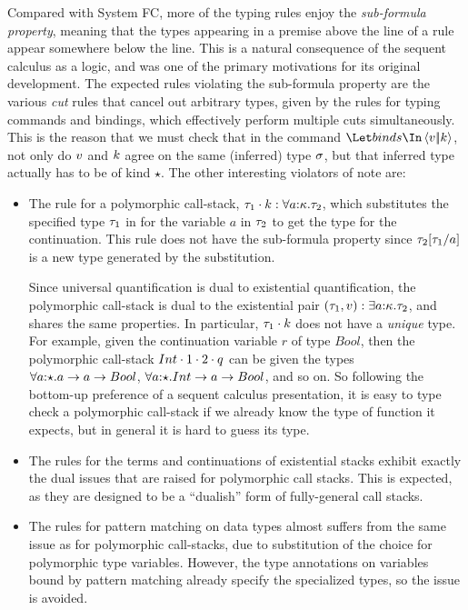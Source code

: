\documentclass{article}
\begin{document}
Compared with System FC, more of the typing rules enjoy the
\emph{sub-formula property}, meaning that the types appearing in a premise above
the line of a rule appear somewhere below the line.  This is a natural
consequence of the sequent calculus as a logic, and was one of the primary
motivations for its original development.  The expected rules violating the
sub-formula property are the various \emph{cut} rules that cancel out arbitrary
types, given by the rules for typing commands and bindings, which effectively
perform multiple cuts simultaneously.  This is the reason that we must check
that in the command $\mcut{\tm}{\ko}{\binds}$, not only do $v$ and $k$ agree
on the same (inferred) type $\sigma$, but that inferred type actually has to be of
kind $\star$.  The other interesting violators of note are:
\begin{itemize}
\item The rule for a polymorphic call-stack,
  ${\tau_1}\cdot{k} : \forall a{:}{\kappa}.\tau_2$, which substitutes the
  specified type $\tau_1$ in for the variable $a$ in $\tau_2$ to get the type for
  the continuation.  This rule does not have the sub-formula property since
  $\tau_2[\tau_1/a]$ is a new type generated by the substitution.

  Since universal quantification is dual to existential quantification, the
  polymorphic call-stack is dual to the existential pair
  $(\tau_1,v) : \exists a{:}{\kappa}.\tau_2$, and shares the same properties.
  In particular, ${\tau_1}\cdot{k}$ does not have a \emph{unique} type.  For
  example, given the continuation variable $r$ of type $Bool$, then the
  polymorphic call-stack ${Int}\cdot{{1}\cdot{{2}\cdot{q}}}$ can be given the types
  $\forall a{:}{\star}. a \to a \to Bool$,
  $\forall a{:}{\star}. Int \to a \to Bool$, and so on.  So following the
  bottom-up preference of a sequent calculus presentation, it is easy to type
  check a polymorphic call-stack if we already know the type of function it
  expects, but in general it is hard to guess its type.

\item The rules for the terms and continuations of existential stacks exhibit
  exactly the dual issues that are raised for polymorphic call stacks.  This is
  expected, as they are designed to be a ``dualish'' form of fully-general call
  stacks.

\item The rules for pattern matching on data types almost suffers from the same
  issue as for polymorphic call-stacks, due to substitution of the choice for
  polymorphic type variables.  However, the type annotations on variables bound
  by pattern matching already specify the specialized types, so the issue is
  avoided.


\end{itemize}
\end{document}
